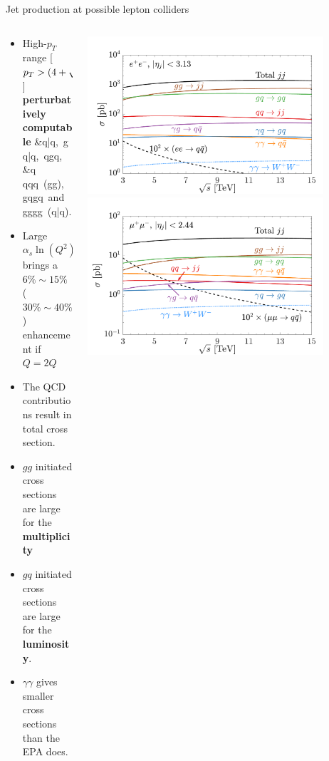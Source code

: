 \documentclass[aspectratio=169]{beamer}
\begin{document}
\begin{frame}{Jet production at possible lepton colliders}
	\begin{columns}
		\begin{column}{0.65\textwidth}
			\begin{itemize}
				\item High-$p_T$ range [$p_T>\left(4+\sqrt s/3 \,{\rm TeV}\right)\,{\rm GeV}$]\\ {\bf perturbatively computable}
				\vspace{-3mm}
				\bea
				&\gamma\gamma \to q\bar q,\ \gamma g \to q\bar{q},~\gamma q\to  gq,\\
				&q q\to qq\ (gg),\ gq\to gq\ {\rm and}\ gg\to gg\ (q\bar{q}).\nonumber
				\eea
				\item Large $\alpha_s\ln(Q^2)$ brings a $6\%\sim 15\%$ ($30\%\sim 40\%$) enhancement if $Q=2 Q$
				\item The QCD contributions result in total cross section. 
				\item $gg$ initiated cross sections are large for the {\bf multiplicity}
				\item $gq$ initiated cross sections are large for the {\bf luminosity}.
				\item $\gamma \gamma$ gives smaller cross sections than the EPA does.
			\end{itemize}
		\end{column}
	\begin{column}{0.44\textwidth}
		\includegraphics[width=0.85\textwidth]{figs/dijjet_e_5d_3pt_s20}
		\includegraphics[width=0.85\textwidth]{figs/dijjet_mu_10d_3pt_s20}

\end{column}
\end{columns}
\end{frame}
\end{document}
